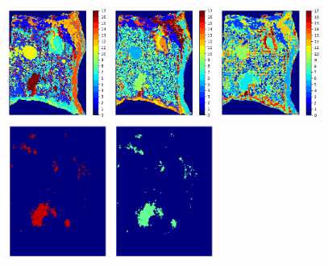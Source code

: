 \documentclass[journal=jacsat,manuscript=article]{achemso}
\begin{document}
\begin{figure}[htbp]
  \centering
  \begin{minipage}[c]{0.9\textwidth}
  {
    \includegraphics[width=0.3\textwidth]{pic/prostate/kmeans_all.png}
    \includegraphics[width=0.3\textwidth]{pic/prostate/minibatchkmeans_all.png}
    \includegraphics[width=0.3\textwidth]{pic/prostate/gmm_all.png}
    \\
    \includegraphics[width=0.3\textwidth]{pic/prostate/kmeans_selected.png}
    \includegraphics[width=0.3\textwidth]{pic/prostate/minibatchkmeans_selected.png}
}
\end{minipage}
\end{figure}
\end{document}
